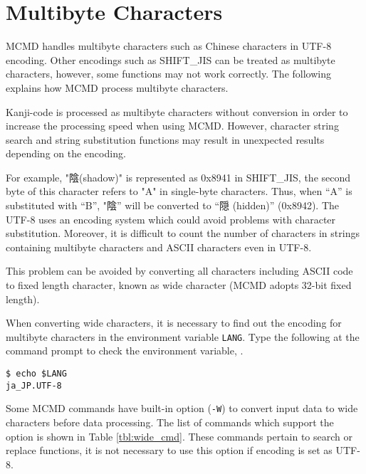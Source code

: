 %

\section{Multibyte Characters\label{sect:multibyte}}

MCMD handles multibyte characters such as Chinese characters in UTF-8 encoding. 
Other encodings such as SHIFT\_JIS can be treated as multibyte characters, however, some functions may not work correctly. The following explains how MCMD process multibyte characters.
 
 Kanji-code is processed as multibyte characters without conversion in order to increase the processing speed when using MCMD. However, character string search and string substitution functions may result in unexpected results depending on the encoding.

For example, "陰(shadow)" is represented as 0x8941 in SHIFT\_JIS, the second byte of this character refers to "A" in single-byte characters. Thus, when “A” is substituted with “B”,  "陰” will be converted to “隠 (hidden)” (0x8942). The UTF-8 uses an encoding system which could avoid problems with character substitution. Moreover, it is difficult to count the number of characters in strings containing multibyte characters and ASCII characters even in UTF-8. 

This problem can be avoided by converting all characters including ASCII code to fixed length character, known as wide character (MCMD adopts 32-bit fixed length). 

When converting wide characters, it is necessary to find out the encoding for multibyte characters in the environment variable \verb|LANG|. Type the following at the command prompt to check the environment variable, . 
 
\begin{Verbatim}[baselinestretch=0.7,frame=single]
$ echo $LANG
ja_JP.UTF-8
\end{Verbatim}

Some MCMD commands have built-in option (\verb|-W|) to convert input data to wide characters before data processing. The list of commands which support the option is shown in Table \ref{tbl:wide_cmd}. 
These commands pertain to search or replace functions, it is not necessary to use this option if encoding is set as UTF-8. 

